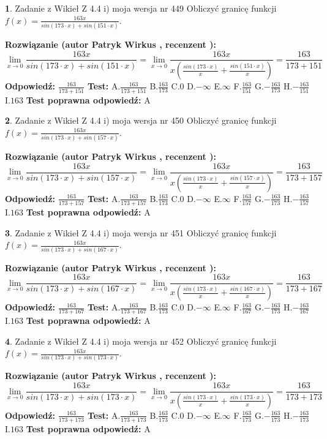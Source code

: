 \documentclass[12pt, a4paper]{article}
\theoremstyle{definition} %
\newtheorem{zad}{}
\newcommand{\zadStart}[1]{\begin{zad}#1\newline}
\newcommand{\zadStop}{\end{zad}}
\newcommand{\rozwStart}[2]{\noindent \textbf{Rozwiązanie (autor #1 , recenzent #2): }\newline}
\newcommand{\rozwStop}{\newline}
\newcommand{\odpStart}{\noindent \textbf{Odpowiedź:}\newline}
\newcommand{\odpStop}{\newline}
\newcommand{\testStart}{\noindent \textbf{Test:}\newline}
\newcommand{\testStop}{\newline}
\newcommand{\kluczStart}{\noindent \textbf{Test poprawna odpowiedź:}\newline}
\newcommand{\kluczStop}{\newline}
\begin{document}
\zadStart{Zadanie z Wikieł Z 4.4 i) moja wersja nr 449}
Obliczyć granicę funkcji $f(x)=\frac{163x}{sin(173\cdot x) +sin(151\cdot x)}$.
\zadStop
\rozwStart{Patryk Wirkus}{}
$$\lim\limits_{x\to 0}\frac{163x}{sin(173\cdot x) +sin(151\cdot x)}=\lim\limits_{x\to 0}\frac{163x}{x(\frac{sin(173\cdot x)}{x}+\frac{sin(151\cdot x)}{x})}=\frac{163}{173+151}$$
\rozwStop
\odpStart
$\frac{163}{173+151}$
\odpStop
\testStart
A.$\frac{163}{173+151}$
B.$\frac{163}{173}$
C.$0$
D.$-\infty$
E.$\infty$
F.$\frac{163}{151}$
G.$-\frac{163}{173}$
H.$-\frac{163}{151}$
I.$163$
\testStop
\kluczStart
A
\kluczStop



\zadStart{Zadanie z Wikieł Z 4.4 i) moja wersja nr 450}
Obliczyć granicę funkcji $f(x)=\frac{163x}{sin(173\cdot x) +sin(157\cdot x)}$.
\zadStop
\rozwStart{Patryk Wirkus}{}
$$\lim\limits_{x\to 0}\frac{163x}{sin(173\cdot x) +sin(157\cdot x)}=\lim\limits_{x\to 0}\frac{163x}{x(\frac{sin(173\cdot x)}{x}+\frac{sin(157\cdot x)}{x})}=\frac{163}{173+157}$$
\rozwStop
\odpStart
$\frac{163}{173+157}$
\odpStop
\testStart
A.$\frac{163}{173+157}$
B.$\frac{163}{173}$
C.$0$
D.$-\infty$
E.$\infty$
F.$\frac{163}{157}$
G.$-\frac{163}{173}$
H.$-\frac{163}{157}$
I.$163$
\testStop
\kluczStart
A
\kluczStop



\zadStart{Zadanie z Wikieł Z 4.4 i) moja wersja nr 451}
Obliczyć granicę funkcji $f(x)=\frac{163x}{sin(173\cdot x) +sin(167\cdot x)}$.
\zadStop
\rozwStart{Patryk Wirkus}{}
$$\lim\limits_{x\to 0}\frac{163x}{sin(173\cdot x) +sin(167\cdot x)}=\lim\limits_{x\to 0}\frac{163x}{x(\frac{sin(173\cdot x)}{x}+\frac{sin(167\cdot x)}{x})}=\frac{163}{173+167}$$
\rozwStop
\odpStart
$\frac{163}{173+167}$
\odpStop
\testStart
A.$\frac{163}{173+167}$
B.$\frac{163}{173}$
C.$0$
D.$-\infty$
E.$\infty$
F.$\frac{163}{167}$
G.$-\frac{163}{173}$
H.$-\frac{163}{167}$
I.$163$
\testStop
\kluczStart
A
\kluczStop



\zadStart{Zadanie z Wikieł Z 4.4 i) moja wersja nr 452}
Obliczyć granicę funkcji $f(x)=\frac{163x}{sin(173\cdot x) +sin(173\cdot x)}$.
\zadStop
\rozwStart{Patryk Wirkus}{}
$$\lim\limits_{x\to 0}\frac{163x}{sin(173\cdot x) +sin(173\cdot x)}=\lim\limits_{x\to 0}\frac{163x}{x(\frac{sin(173\cdot x)}{x}+\frac{sin(173\cdot x)}{x})}=\frac{163}{173+173}$$
\rozwStop
\odpStart
$\frac{163}{173+173}$
\odpStop
\testStart
A.$\frac{163}{173+173}$
B.$\frac{163}{173}$
C.$0$
D.$-\infty$
E.$\infty$
F.$\frac{163}{173}$
G.$-\frac{163}{173}$
H.$-\frac{163}{173}$
I.$163$
\testStop
\kluczStart
A
\kluczStop
\end{document}

